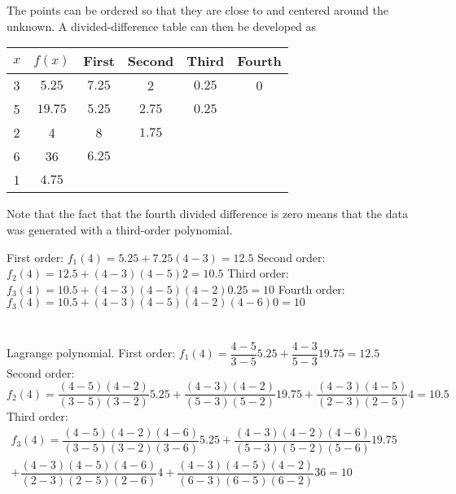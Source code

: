 \documentclass[../main.tex]{subfiles}
\begin{document}
\section{}
\begin{blockquote}
The points can be ordered so that they are close to and centered around the unknown. A divided-difference table can then be developed as
\end{blockquote}
	\bigbreak
\begin{tabular}{cccccc}
\hline
$x$ & $f(x)$ & First & Second & Third & Fourth \\
\hline
3 & $5.25$ & $7.25$ & 2 & $0.25$ & 0 \\
5 & $19.75$ & $5.25$ & $2.75$ & $0.25$ &  \\
2 & 4 & 8 & $1.75$ &  &  \\
6 & 36 & $6.25$ &  &  &  \\
1 & $4.75$ &  &  &  &  \\
\hline
\end{tabular}
	\bigbreak
\begin{blockquote}
Note that the fact that the fourth divided difference is zero means that the data was generated with a third-order polynomial.
\end{blockquote}
	\bigbreak
First order:
	\bigbreak
$f_{1}(4)=5.25+7.25(4-3)=12.5$
	\bigbreak
Second order:
	\bigbreak
$f_{2}(4)=12.5+(4-3)(4-5) 2=10.5$
	\bigbreak
Third order:
	\bigbreak
$f_{3}(4)=10.5+(4-3)(4-5)(4-2) 0.25=10$
	\bigbreak
Fourth order:
	\bigbreak
$f_{3}(4)=10.5+(4-3)(4-5)(4-2)(4-6) 0=10$
	\bigbreak



\section{}
Lagrange polynomial.
First order:
	\bigbreak
$f_{1}(4)=\dfrac{4-5}{3-5} 5.25+\dfrac{4-3}{5-3} 19.75=12.5$
	\bigbreak
Second order:
	\bigbreak
$f_{2}(4)=\dfrac{(4-5)(4-2)}{(3-5)(3-2)} 5.25+\dfrac{(4-3)(4-2)}{(5-3)(5-2)} 19.75+\dfrac{(4-3)(4-5)}{(2-3)(2-5)} 4=10.5$
	\bigbreak
Third order:
	\bigbreak
$
\begin{aligned}
f_{3}(4)=\dfrac{(4-5)(4-2)(4-6)}{(3-5)(3-2)(3-6)} 5.25+\dfrac{(4-3)(4-2)(4-6)}{(5-3)(5-2)(5-6)} 19.75\\
+ \dfrac{(4-3)(4-5)(4-6)}{(2-3)(2-5)(2-6)} 4+\dfrac{(4-3)(4-5)(4-2)}{(6-3)(6-5)(6-2)} 36=10
\end{aligned}
$
	\bigbreak
\end{document}
